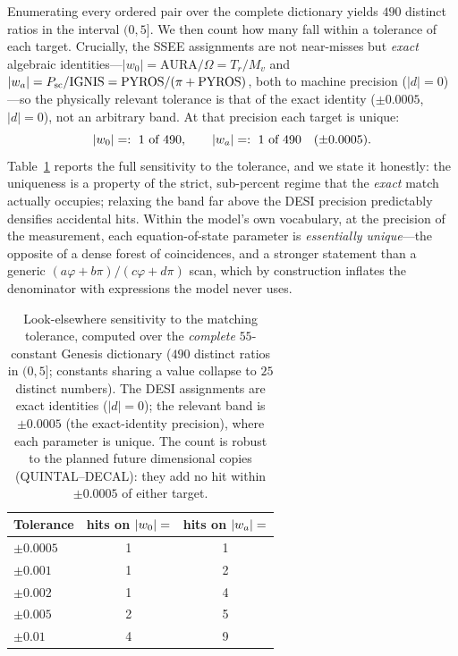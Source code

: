 \documentclass[a4paper,11pt]{article}
\begin{document}
Enumerating every ordered pair over the complete dictionary yields $490$ distinct
ratios in the interval $(0,5]$. We then count how many fall within a tolerance of
each target. Crucially, the SSEE assignments are not near-misses but \emph{exact}
algebraic identities---$|w_0|=\mathrm{AURA}/\Omega=T_r/M_v$ and
$|w_a|=P_{\rm sc}/\mathrm{IGNIS}=\mathrm{PYROS}/(\pi+\mathrm{PYROS})$, both to machine precision
($|d|=0$)---so the physically relevant tolerance is that of the exact identity
($\pm0.0005$, $|d|=0$), not an arbitrary band. At that precision each target is
unique:
\begin{equation}
  |w_0|=\val{S_DE_d6}:\ \text{1 of 490},\qquad
  |w_a|=\val{WA_abs_d6}:\ \text{1 of 490}\quad(\pm0.0005).
  \label{eq:lookelsewhere}
\end{equation}
Table~\ref{tab:lookelsewhere-tol} reports the full sensitivity to the tolerance,
and we state it honestly: the uniqueness is a property of the strict, sub-percent
regime that the \emph{exact} match actually occupies; relaxing the band far above
the DESI precision predictably densifies accidental hits. Within the model's own
vocabulary, at the precision of the measurement, each equation-of-state parameter
is \emph{essentially unique}---the opposite of a dense forest of coincidences, and
a stronger statement than a generic $(a\varphi+b\pi)/(c\varphi+d\pi)$ scan, which
by construction inflates the denominator with expressions the model never uses.

\begin{table}[ht]
\centering
\caption{Look-elsewhere sensitivity to the matching tolerance, computed over the
\emph{complete} $55$-constant Genesis dictionary ($490$ distinct ratios in
$(0,5]$; constants sharing a value collapse to $25$ distinct
numbers). The DESI assignments are exact identities ($|d|=0$); the relevant band is
$\pm0.0005$ (the exact-identity precision), where each parameter is unique. The count is
robust to the planned future dimensional copies (QUINTAL--DECAL): they add no hit
within $\pm0.0005$ of either target.}
\label{tab:lookelsewhere-tol}
\begin{tabular}{lcc}
\toprule
Tolerance & hits on $|w_0|=\val{S_DE_d6}$ & hits on $|w_a|=\val{WA_abs_d6}$ \\
\midrule
$\pm0.0005$ & 1 & 1 \\
$\pm0.001$  & 1 & 2 \\
$\pm0.002$  & 1 & 4 \\
$\pm0.005$  & 2 & 5 \\
$\pm0.01$   & 4 & 9 \\
\bottomrule
\end{tabular}
\end{table}
\end{document}
